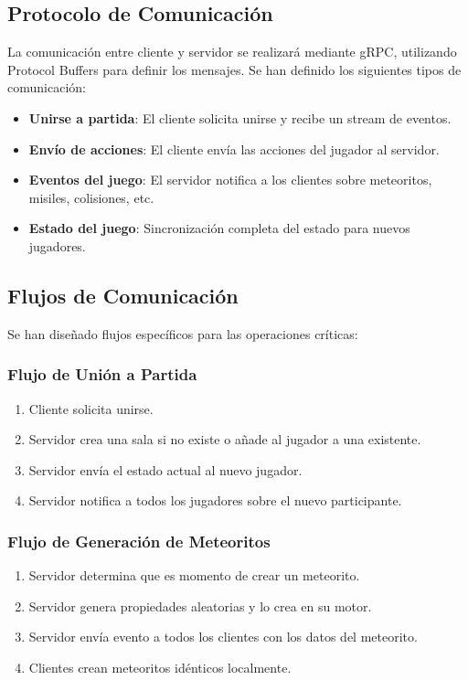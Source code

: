 \documentclass[12pt,letterpaper]{article}
\begin{document}
\subsection{Protocolo de Comunicación}

La comunicación entre cliente y servidor se realizará mediante gRPC, utilizando Protocol Buffers para definir los mensajes. Se han definido los siguientes tipos de comunicación:

\begin{itemize}
    \item \textbf{Unirse a partida}: El cliente solicita unirse y recibe un stream de eventos.
    \item \textbf{Envío de acciones}: El cliente envía las acciones del jugador al servidor.
    \item \textbf{Eventos del juego}: El servidor notifica a los clientes sobre meteoritos, misiles, colisiones, etc.
    \item \textbf{Estado del juego}: Sincronización completa del estado para nuevos jugadores.
\end{itemize}

\subsection{Flujos de Comunicación}

Se han diseñado flujos específicos para las operaciones críticas:

\subsubsection{Flujo de Unión a Partida}
\begin{enumerate}
    \item Cliente solicita unirse.
    \item Servidor crea una sala si no existe o añade al jugador a una existente.
    \item Servidor envía el estado actual al nuevo jugador.
    \item Servidor notifica a todos los jugadores sobre el nuevo participante.
\end{enumerate}

\subsubsection{Flujo de Generación de Meteoritos}
\begin{enumerate}
    \item Servidor determina que es momento de crear un meteorito.
    \item Servidor genera propiedades aleatorias y lo crea en su motor.
    \item Servidor envía evento a todos los clientes con los datos del meteorito.
    \item Clientes crean meteoritos idénticos localmente.
\end{enumerate}
\end{document}
